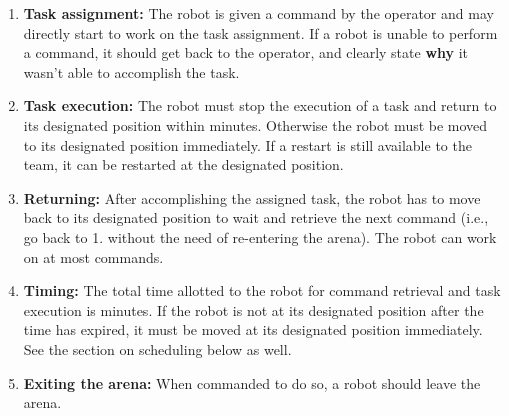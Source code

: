 \begin{enumerate}
	\item \textbf{Task assignment:} The robot is given a command by the operator and may directly start to work on the task assignment. If a robot is unable to perform a command, it should get back to the operator, and clearly state \textbf{why} it wasn't able to accomplish the task. \\


	\item \textbf{Task execution:} The robot must stop the execution of a task and return to its designated position within \eegpsrMaxCmdTime minutes. Otherwise the robot must be moved to its designated position immediately. If a restart is still available to the team, it can be restarted at the designated position. \\

	\item \textbf{Returning:} After accomplishing the assigned task, the robot has to move back to its designated position to wait and retrieve the next command (i.e., go back to 1. without the need of re-entering the arena). The robot can work on at most \eegpsrMaxCmd commands. \\

	\item \textbf{Timing:} The total time allotted to the robot for command retrieval and task execution is \eegpsrMaxTeamTime minutes. If the robot is not at its designated position after the time has expired, it must be moved at its designated position immediately. See the section on scheduling below as well.\\

	\item \textbf{Exiting the arena:} When commanded to do so, a robot should leave the arena. \\

\end{enumerate}

